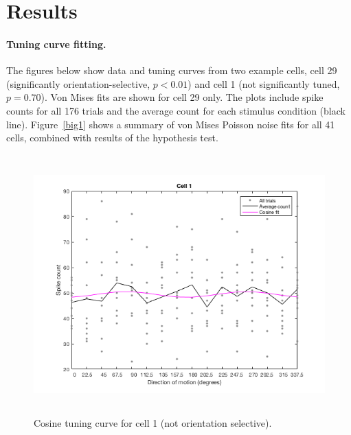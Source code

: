 \documentclass[10pt]{article}
\begin{document}
\section*{Results}
 
\paragraph{Tuning curve fitting.} The figures below show data and tuning curves from two example cells, cell 29 (significantly orientation-selective, $p<0.01$) and cell 1 (not significantly tuned, $p=0.70$). Von Mises fits are shown for cell 29 only. The plots include spike counts for all 176 trials and the average count for each stimulus condition (black line). Figure~\ref{big1} shows a summary of von Mises Poisson noise fits for all 41 cells, combined with results of the hypothesis test.

\newpage

\begin{figure}[!h]
\centering
\includegraphics[height=10cm]{fitCosCell1.png}
\caption{Cosine tuning curve for cell 1 (not orientation selective).
\label{fitCos1}}
\end{figure}
\end{document}
